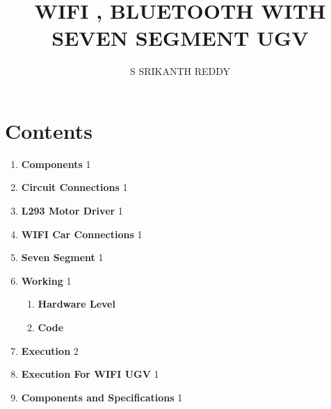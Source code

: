 \documentclass[journal,12pt,twocolumn]{IEEEtran}
\begin{document}
\title{ WIFI , BLUETOOTH WITH SEVEN SEGMENT UGV }

\author{S SRIKANTH REDDY}
\maketitle
\newpage
\bigskip
\renewcommand{\thefigure}{\theenumi}
\renewcommand{\thetable}{\theenumi}
\raggedright

%

\section*{Contents}
\begin{enumerate}
\item \textbf{Components} \hspace{4cm} 1\\
\item \textbf{Circuit Connections} \hspace{2.6cm} 1\\
\item \textbf{L293 Motor Driver} \hspace{2.7cm} 1\\
\item \textbf{WIFI Car Connections }\hspace{2.0cm} 1\\
\item \textbf{Seven Segment}\hspace{3.6cm} 1\\
\item \textbf{Working}\hspace{4.8cm} 1 \\
	\begin{enumerate}
	\item \textbf{Hardware Level}
	\item \textbf{Code}
	\end{enumerate}
\item \textbf{Execution} \hspace{4.45cm} 2 \\
\item \textbf{Execution For WIFI UGV} \hspace{1.4cm} 1 \\
\item \textbf{Components and Specifications} \hspace{0.5cm} 1 \\
\end{enumerate}
\end{document}
